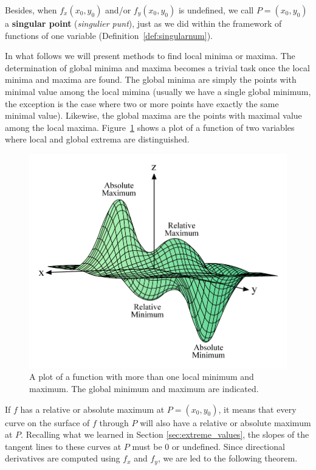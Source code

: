 Besides, when $f_x(x_0,y_0)$ and/or $f_y(x_0,y_0)$ is undefined, we call $P=(x_0,y_0)$ a \textbf{singular point} (\textit{singulier punt}), just as we did within the framework of functions of one variable (Definition~\ref{def:singularnum}). 



In what follows we will present methods to find local minima or maxima. The determination of global minima and maxima becomes a trivial task once the local minima and maxima are found. The global minima are simply the points with minimal value among the local mimina (usually we have a single global minimum, the exception is the case where two or more points have exactly the same minimal value). Likewise, the global maxima are the points with maximal value among the local maxima. Figure~\ref{fig_multi_var_23} shows a plot of a function of two variables where local and global extrema are distinguished. 

\begin{figure}
\centering
\includegraphics[scale=1]{fig_multi_var_23.png} 
\caption{A plot of a function with more than one local minimum and maximum. The global minimum and maximum are indicated.}
\label{fig_multi_var_23}
\end{figure}


If $f$ has a relative or absolute maximum at $P=(x_0,y_0)$, it means that every curve on the surface of $f$ through $P$ will also have a relative or absolute maximum at $P$. Recalling what we learned in Section \ref{sec:extreme_values}, the slopes of the tangent lines to these curves at $P$ must be 0 or undefined. Since directional derivatives are computed using $f_x$ and $f_y$, we are led to the following theorem.

